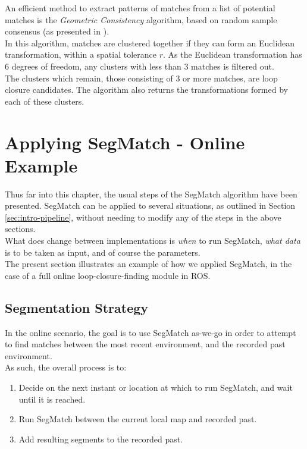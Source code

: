An efficient method to extract patterns of matches from a list of potential matches is the \textit{Geometric Consistency} algorithm, based on random sample consensus (as presented in \cite{fischler1981random}).\\

In this algorithm, matches are clustered together if they can form an Euclidean transformation, within a spatial tolerance $r$. As the Euclidean transformation has 6 degrees of freedom, any clusters with less than 3 matches is filtered out.\\

The clusters which remain, those consisting of 3 or more matches, are loop closure candidates. The algorithm also returns the transformations formed by each of these clusters.\\

\section{Applying SegMatch - Online Example}
\label{sec:online}

Thus far into this chapter, the usual steps of the SegMatch algorithm have been presented. SegMatch can be applied to several situations, as outlined in Section \ref{sec:intro-pipeline}, without needing to modify any of the steps in the above sections.\\

What does change between implementations is \textit{when} to run SegMatch, \textit{what data} is to be taken as input, and of course the parameters.\\

The present section illustrates an example of how we applied SegMatch, in the case of a full online loop-closure-finding module in ROS.

\subsection{Segmentation Strategy}
\label{subsec:segmentation-strategy}

In the online scenario, the goal is to use SegMatch as-we-go in order to attempt to find matches between the most recent environment, and the recorded past environment.\\

As such, the overall process is to:   

\begin{enumerate}
\item Decide on the next instant or location at which to run SegMatch, and wait until it is reached.
\item Run SegMatch between the current local map and recorded past.
\item Add resulting segments to the recorded past.
\end{enumerate}

